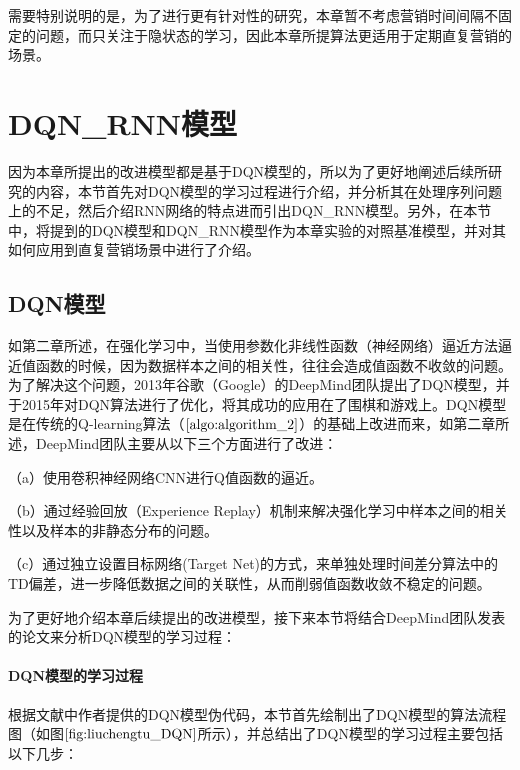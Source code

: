 需要特别说明的是，为了进行更有针对性的研究，本章暂不考虑营销时间间隔不固定的问题，而只关注于隐状态的学习，因此本章所提算法更适用于定期直复营销的场景。


\section{DQN_RNN模型}
因为本章所提出的改进模型都是基于DQN模型的，所以为了更好地阐述后续所研究的内容，本节首先对DQN模型的学习过程进行介绍，并分析其在处理序列问题上的不足，然后介绍RNN网络的特点进而引出DQN_RNN模型。另外，在本节中，将提到的DQN模型和DQN_RNN模型作为本章实验的对照基准模型，并对其如何应用到直复营销场景中进行了介绍。

\subsection{DQN模型}
如第二章所述，在强化学习中，当使用参数化非线性函数（神经网络）逼近方法逼近值函数的时候，因为数据样本之间的相关性，往往会造成值函数不收敛的问题。为了解决这个问题，2013年谷歌（Google）的DeepMind团队提出了DQN模型，并于2015年对DQN算法进行了优化，将其成功的应用在了围棋和游戏上。DQN模型是在传统的Q-learning算法（$\ref{algo:algorithm_2}$）的基础上改进而来，如第二章所述，DeepMind团队主要从以下三个方面进行了改进：

（a）使用卷积神经网络CNN进行Q值函数的逼近。

（b）通过经验回放（Experience Replay）机制来解决强化学习中样本之间的相关性以及样本的非静态分布的问题。

（c）通过独立设置目标网络(Target Net)的方式，来单独处理时间差分算法中的TD偏差，进一步降低数据之间的关联性，从而削弱值函数收敛不稳定的问题。

 为了更好地介绍本章后续提出的改进模型，接下来本节将结合DeepMind团队发表的论文\citep{mnih2013playing,mnih2015human}来分析DQN模型的学习过程：

\paragraph{DQN模型的学习过程}
根据文献\citep{mnih2015human}中作者提供的DQN模型伪代码，本节首先绘制出了DQN模型的算法流程图（如图$\ref{fig:liuchengtu_DQN}$所示），并总结出了DQN模型的学习过程主要包括以下几步：

